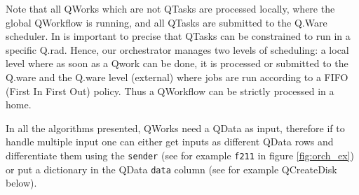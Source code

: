 \documentclass[10pt, conference, compsocconf]{IEEEtran}
\begin{document}
Note that all QWorks which are not QTasks are processed locally, where the global QWorkflow is running, and all QTasks are submitted to the Q.Ware scheduler. In is important to precise that QTasks can be constrained to run in a specific Q.rad. Hence, our orchestrator manages two levels of scheduling: a local level where as soon as a Qwork can be done, it is processed or submitted to the Q.ware and the Q.ware level (external) where jobs are run according to a FIFO (First In First Out) policy. Thus a QWorkflow can be strictly processed in a home.

In all the algorithms presented, QWorks need a QData as input, therefore if to handle multiple input one can either get inputs as different QData rows and differentiate them using the \texttt{sender} (see for example \texttt{f211} in figure \ref{fig:orch_ex}) or put a dictionary in the QData \texttt{data} column (see for example QCreateDisk below).
\end{document}
